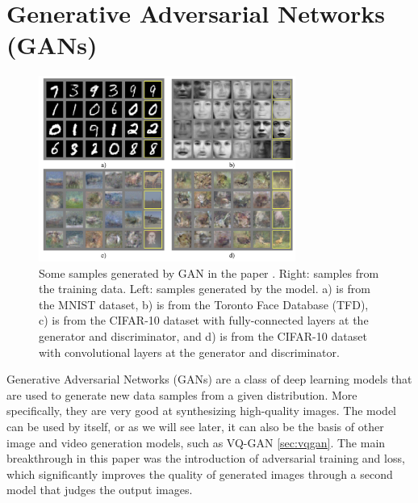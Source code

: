 \section{Generative Adversarial Networks (GANs)}
\label{sec:gan}

\begin{figure}
    \centering
    \includegraphics[width=0.75\textwidth]{images/gan/gan_samples.png}
    \caption{Some samples generated by GAN in the paper \cite{gan}. Right: samples from the training data. Left: samples generated by the model. a) is from the MNIST dataset, b) is from the Toronto Face Database (TFD), c) is from the CIFAR-10 dataset with fully-connected layers at the generator and discriminator, and d) is from the CIFAR-10 dataset with convolutional layers at the generator and discriminator.}
\end{figure}

Generative Adversarial Networks (GANs) \cite{gan} are a class of deep learning models that are used to generate new data samples from a given distribution. More specifically, they are very good at synthesizing high-quality images. The model can be used by itself, or as we will see later, it can also be the basis of other image and video generation models, such as VQ-GAN \ref{sec:vqgan}. The main breakthrough in this paper was the introduction of adversarial training and loss, which significantly improves the quality of generated images through a second model that judges the output images.




